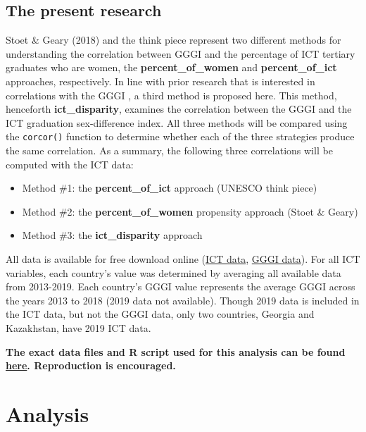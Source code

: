 \documentclass[]{book}
\providecommand{\tightlist}{%
  \setlength{\itemsep}{0pt}\setlength{\parskip}{0pt}}
\begin{document}
\section{The present research}\label{the-present-research-1}

Stoet \& Geary (2018) and the think piece represent two different
methods for understanding the correlation between GGGI and the
percentage of ICT tertiary graduates who are women, the
\textbf{percent\_of\_women} and \textbf{percent\_of\_ict} approaches,
respectively. In line with prior research that is interested in
correlations with the GGGI \citep{zentnerSteppingOutCaveman2012}, a
third method is proposed here. This method, henceforth
\textbf{ict\_disparity}, examines the correlation between the GGGI and
the ICT graduation sex-difference index. All three methods will be
compared using the \texttt{corcor()} function to determine whether each
of the three strategies produce the same correlation. As a summary, the
following three correlations will be computed with the ICT data:

\begin{itemize}
\tightlist
\item
  Method \#1: the \textbf{percent\_of\_ict} approach (UNESCO think
  piece)
\item
  Method \#2: the \textbf{percent\_of\_women} propensity approach (Stoet
  \& Geary)
\item
  Method \#3: the \textbf{ict\_disparity} approach
\end{itemize}

All data is available for free download online
(\href{http://data.uis.unesco.org/Index.aspx?DataSetCode=EDULIT_DS\&popupcustomise=true\&lang=en\#}{ICT
data},
\href{https://tcdata360-backend.worldbank.org/api/v1/datasets/743/dump.csv}{GGGI
data}). For all ICT variables, each country's value was determined by
averaging all available data from 2013-2019. Each country's GGGI value
represents the average GGGI across the years 2013 to 2018 (2019 data not
available). Though 2019 data is included in the ICT data, but not the
GGGI data, only two countries, Georgia and Kazakhstan, have 2019 ICT
data.

\textbf{The exact data files and R script used for this analysis can be
found
\href{https://github.com/mandydavis/ict-gep-re-analysis/tree/master/data\%20\%26\%20R\%20script}{here}.
Reproduction is encouraged.}

\chapter{Analysis}\label{analysis}
\end{document}
